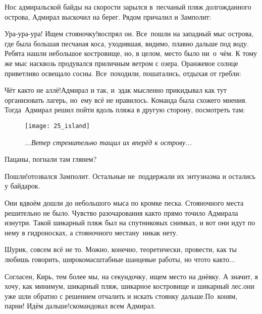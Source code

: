 Нос адмиральской байды на скорости зарылся в~песчаный пляж долгожданного острова, Адмирал выскочил на берег. Рядом причалил и Замполит:


\diagdash Ура-ура-ура! Ищем стояночку!\mdash воспрял он. Все~пошли на западный мыс острова, где была большая песчаная коса, уходившая, видимо, плавно дальше под воду. Ребята нашли небольшое костровище, но, в целом, место было ни~о~чём. К тому же мыс насквозь продувался приличным ветром с озера. Оранжевое солнце приветливо освещало сосны. Все~походили, пошатались, отдыхая от гребли:

\diagdash Чёт как\sdash то не аллё!\mdash Адмирал и так, и~эдак мысленно прикидывал как тут организовать лагерь, но~ему всё не нравилось. Команда была схожего мнения. Тогда~Адмирал решил пойти вдоль пляжа в другую сторону, посмотреть там:

\begin{figure}[h]
	\centering
	\texttt{[image: 25\_island]}
	\caption{\small\textit{...Ветер стремительно тащил их вперёд к острову...}}
\end{figure}

\diagdash Пацаны, погнали там глянем?

\diagdash Пошли!\mdash отозвался Замполит. Остальные не~поддержали их энтузиазма и остались у байдарок.

Они вдвоём дошли до небольшого мыса по кромке песка. Стояночного места решительно не было. Чувство разочарования как\sdash то прямо точило Адмирала изнутри. Такой шикарный пляж был на спутниковых снимках, и вот они идут по нему в гидроносках, а стояночного места\mdash ну~никак нету.

\diagdash Шурик, совсем всё не то. Можно, конечно, теоретически, провести, как ты любишь говорить, широкомасштабные шанцевые работы, но что\sdash то как\sdash то$\ldots$

\diagdash Согласен, Кирь, тем более мы, на секундочку, ищем место на днёвку. А значит, я хочу, как минимум, шикарный пляж, шикарное костровище и шикарный лес.\mdash они уже шли обратно с решением отчалить и искать стоянку дальше.\mdash По~коням, парни! Идём дальше!\mdash скомандовал всем Адмирал.

